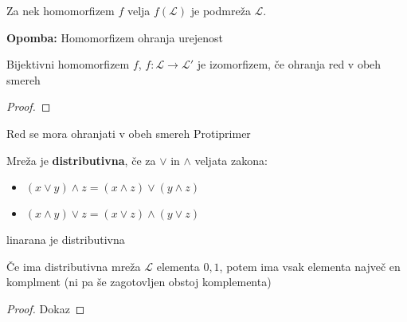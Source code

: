 \documentclass{beamer}
\newenvironment{remark}
{\textbf{Opomba:}}
{}
\begin{document}
\begin{frame}
\begin{theorem}
Za nek homomorfizem $f$ velja $f(\mathcal{L})$ je podmreža $\mathcal{L}$.
\end{theorem}

\begin{remark}
Homomorfizem ohranja urejenost
\end{remark}
\end{frame}


\begin{frame}

\begin{theorem}
Bijektivni homomorfizem $f$, $f : \mathcal{L} \to \mathcal{L}'$ je izomorfizem, če ohranja red v obeh smereh
\end{theorem}

\begin{proof}

\end{proof}

\end{frame}

\begin{frame}
\begin{block}{Red se mora ohranjati v obeh smereh}
Protiprimer
\end{block}
\end{frame}


\begin{frame}
\begin{definition}
Mreža je \textbf{distributivna}, če za $\lor$ in $\land$ veljata zakona:
\begin{itemize}
\item $(x \lor y) \land z = (x \land z) \lor (y \land z)$
\item $(x \land y) \lor z = (x \lor z) \land (y \lor z)$
\end{itemize}
\end{definition}


\begin{example}
linarana je distributivna
\end{example}

\end{frame}

\begin{frame}
\begin{theorem}
Če ima distributivna mreža $\mathcal{L}$ elementa $0,1$, potem ima vsak elementa največ en komplment (ni pa še zagotovljen obstoj komplementa)
\end{theorem}

\begin{proof}
Dokaz
\end{proof}

\end{frame}
\end{document}

